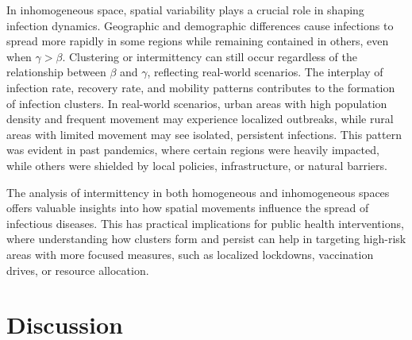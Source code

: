 \documentclass[sn-basic]{sn-jnl}%
\theoremstyle{thmstyleone}%
\theoremstyle{thmstyletwo}%
\theoremstyle{thmstylethree}%
\numberwithin{equation}{theorem}
\begin{document}
In inhomogeneous space, spatial variability plays a crucial role in shaping infection dynamics. Geographic and demographic differences cause infections to spread more rapidly in some regions while remaining contained in others, even when $\gamma > \beta$. Clustering or intermittency can still occur regardless of the relationship between $\beta$ and $\gamma$, reflecting real-world scenarios. The interplay of infection rate, recovery rate, and mobility patterns contributes to the formation of infection clusters. In real-world scenarios, urban areas with high population density and frequent movement may experience localized outbreaks, while rural areas with limited movement may see isolated, persistent infections. This pattern was evident in past pandemics, where certain regions were heavily impacted, while others were shielded by local policies, infrastructure, or natural barriers.

The analysis of intermittency in both homogeneous and inhomogeneous spaces offers valuable insights into how spatial movements influence the spread of infectious diseases. This has practical implications for public health interventions, where understanding how clusters form and persist can help in targeting high-risk areas with more focused measures, such as localized lockdowns, vaccination drives, or resource allocation.

\section{Discussion}
\end{document}
